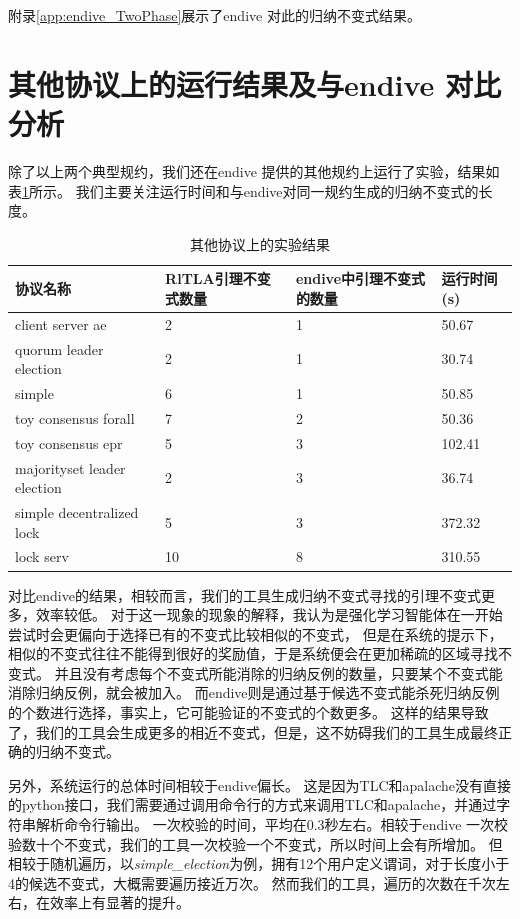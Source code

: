附录\ref{app:endive_TwoPhase}展示了endive 对此的归纳不变式结果。

\section{其他协议上的运行结果及与endive 对比分析}
除了以上两个典型规约，我们还在endive 提供的其他规约上运行了实验，结果如表\ref{tab:result}所示。
我们主要关注运行时间和\rltla 与endive对同一规约生成的归纳不变式的长度。
\begin{table}[!htbp]
	\centering
	\caption{其他协议上的实验结果}
	\renewcommand\arraystretch{1.4}
	\begin{tabular}{p{}p{}p{}p{}}
         \toprule
         \textbf{协议名称} &\textbf{RlTLA引理不变式数量} & \textbf{endive中引理不变式的数量}& \textbf{运行时间(s)}\\
         \midrule
         client server ae & 2 & 1 & 50.67\\
         quorum leader election& 2& 1 &30.74\\
         simple& 6& 1 &50.85\\
         toy consensus forall & 7 & 2&50.36  \\ 
         toy consensus epr & 5 & 3 &102.41  \\ 
         majorityset leader election& 2& 3 &36.74\\
         simple decentralized lock& 5 & 3 &372.32\\
         lock serv& 10 & 8 & 310.55\\
         \bottomrule
	\end{tabular}
	\label{tab:result}
\end{table}

对比endive的结果，相较而言，我们的工具生成归纳不变式寻找的引理不变式更多，效率较低。
对于这一现象的现象的解释，我认为是强化学习智能体在一开始尝试时会更偏向于选择已有的不变式比较相似的不变式，
但是在系统的提示下，相似的不变式往往不能得到很好的奖励值，于是系统便会在更加稀疏的区域寻找不变式。
并且没有考虑每个不变式所能消除的归纳反例的数量，只要某个不变式能消除归纳反例，就会被加入。
而endive则是通过基于候选不变式能杀死归纳反例的个数进行选择，事实上，它可能验证的不变式的个数更多。
这样的结果导致了，我们的工具会生成更多的相近不变式，但是，这不妨碍我们的工具生成最终正确的归纳不变式。

另外，系统运行的总体时间相较于endive偏长。
这是因为TLC和apalache没有直接的python接口，我们需要通过调用命令行的方式来调用TLC和apalache，并通过字符串解析命令行输出。
一次校验的时间，平均在0.3秒左右。相较于endive 一次校验数十个不变式，我们的工具一次校验一个不变式，所以时间上会有所增加。
但相较于随机遍历，以\textit{simple\_election}为例，拥有12个用户定义谓词，对于长度小于4的候选不变式，大概需要遍历接近万次。
然而我们的工具，遍历的次数在千次左右，在效率上有显著的提升。

